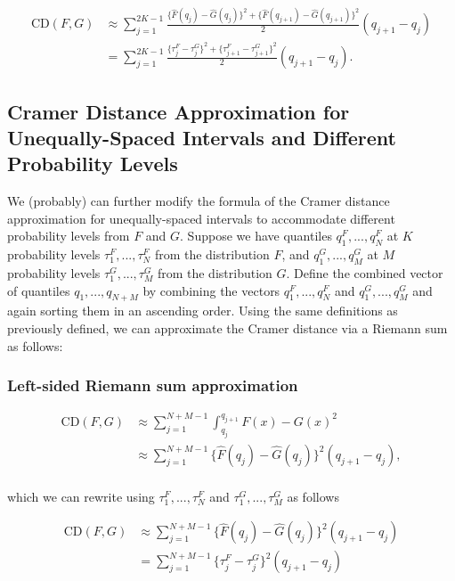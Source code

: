 \documentclass[
]{article}
\begin{document}
\begin{align}
\text{CD}(F,G) 
&\approx\sum^{2K-1}_{j=1}\frac{\{\hat{F}(q_j)-\hat{G}(q_j)\}^2+\{\hat{F}(q_{j+1})-\hat{G}(q_{j+1})\}^2}{2}(q_{j+1}-q_{j})\\
&=
\sum^{2K-1}_{j=1}\frac{\{\tau^F_j-\tau^G_j\}^2+\{\tau^F_{j+1}-\tau^G_{j+1}\}^2}{2}(q_{j+1}-q_{j}).
\end{align}

\hypertarget{cramer-distance-approximation-for-unequally-spaced-intervals-and-different-probability-levels}{%
\subsection{Cramer Distance Approximation for Unequally-Spaced Intervals
and Different Probability
Levels}\label{cramer-distance-approximation-for-unequally-spaced-intervals-and-different-probability-levels}}

We (probably) can further modify the formula of the Cramer distance
approximation for unequally-spaced intervals to accommodate different
probability levels from \(F\) and \(G\). Suppose we have quantiles
\(q_{1}^F,...,q_{N}^F\) at \(K\) probability levels
\(\tau_1^F,...,\tau_N^F\) from the distribution \(F\), and
\(q_{1}^G,...,q_{M}^G\) at \(M\) probability levels
\(\tau_1^G,...,\tau_M^G\) from the distribution \(G\). Define the
combined vector of quantiles \(q_1, . . . , q_{N+M}\) by combining the
vectors \(q_{1}^F,...,q_{N}^F\) and \(q_{1}^G,...,q_{M}^G\) and again
sorting them in an ascending order. Using the same definitions as
previously defined, we can approximate the Cramer distance via a Riemann
sum as follows:

\hypertarget{left-sided-riemann-sum-approximation-1}{%
\subsubsection{Left-sided Riemann sum
approximation}\label{left-sided-riemann-sum-approximation-1}}

\begin{align}
\text{CD}(F,G) &\approx\sum^{N+M-1}_{j=1}\int^{q_{j+1}}_{q_j}{F(x)−G(x)}^2\\
&\approx\sum^{N+M-1}_{j=1}\{\hat{F}(q_j)-\hat{G}(q_j)\}^2(q_{j+1}-q_{j}),\\
\end{align}

which we can rewrite using \(\tau_1^F,...,\tau_N^F\) and
\(\tau_1^G,...,\tau_M^G\) as follows

\begin{align}
\text{CD}(F,G) 
&\approx\sum^{N+M-1}_{j=1}\{\hat{F}(q_j)-\hat{G}(q_j)\}^2(q_{j+1}-q_{j})\\
&=\sum^{N+M-1}_{j=1}\{\tau^F_j-\tau^G_j\}^2(q_{j+1}-q_{j})
\end{align}
\end{document}
